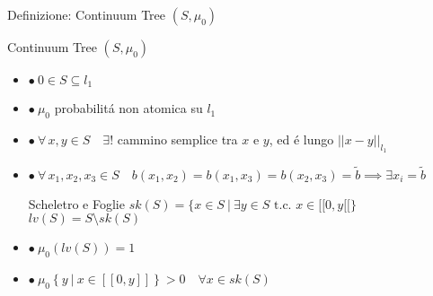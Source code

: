 \documentclass{beamer}
\theoremstyle{definition}
\theoremstyle{plain}
\theoremstyle{remark}
\begin{document}
\begin{frame}{Definizione: Continuum Tree $(S,\mu_0)$}
\begin{block}{Continuum Tree $(S,\mu_0)$}
\begin{itemize}
\item $\bullet \ 0 \in S\subseteq l_1$
\item $\bullet \ \mu_0$ probabilit\'a non atomica su $l_1$
\pause
\item $\bullet \ \forall\, x,y\in S \quad  \exists!$ cammino semplice tra $x$ e $y$, ed \'e lungo $||x-y||_{l_1}$
\pause
\item $\bullet \ \forall \, x_1,x_2,x_3 \in S \quad b(x_1,x_2)=b(x_1,x_3)=b(x_2,x_3)=\tilde{b} \implies \exists x_i=\tilde{b}$
\pause
\begin{minipage}{.7 \textwidth}
\begin{block}{Scheletro e Foglie}
$sk(S)=\bigg\{x\in S \ \bigg| \ \exists y \in S \text{ t.c. } x\in [[0,y[[ \bigg\}$\\
\bigskip
$ lv(S)=S \setminus sk(S)$
\end{block}
\end{minipage}
\pause
\item $\bullet \ \mu_0 \left(lv(S)\right)=1$
\pause
\item $\bullet \ \mu_0\left\{y \ | \ x\in [[0,y]] \right\}>0 \quad \forall x\in sk(S)$
\end{itemize}
\end{block}
\end{frame}
\end{document}
